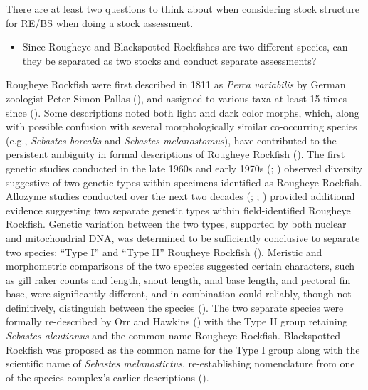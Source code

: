 \documentclass[
]{scrartcl}
\providecommand{\tightlist}{%
  \setlength{\itemsep}{0pt}\setlength{\parskip}{0pt}}\usepackage{longtable,booktabs,array}
\begin{document}
There are at least two questions to think about when considering stock
structure for RE/BS when doing a stock assessment.

\begin{itemize}
\tightlist
\item
  Since Rougheye and Blackspotted Rockfishes are two different species,
  can they be separated as two stocks and conduct separate assessments?
\end{itemize}

Rougheye Rockfish were first described in 1811 as \emph{Perca
variabilis} by German zoologist Peter Simon Pallas
(), and
assigned to various taxa at least 15 times since
(). Some descriptions noted both light and dark color morphs, which,
along with possible confusion with several morphologically similar
co-occurring species (e.g., \emph{Sebastes borealis} and \emph{Sebastes
melanostomus}), have contributed to the persistent ambiguity in formal
descriptions of Rougheye Rockfish (). The first genetic studies conducted in the late
1960s and early 1970s (; ) observed diversity suggestive of two genetic types within
specimens identified as Rougheye Rockfish. Allozyme studies conducted
over the next two decades (; ; )
provided additional evidence suggesting two separate genetic types
within field-identified Rougheye Rockfish. Genetic variation between the
two types, supported by both nuclear and mitochondrial DNA, was
determined to be sufficiently conclusive to separate two species: ``Type
I'' and ``Type II'' Rougheye Rockfish
().
Meristic and morphometric comparisons of the two species suggested
certain characters, such as gill raker counts and length, snout length,
anal base length, and pectoral fin base, were significantly different,
and in combination could reliably, though not definitively, distinguish
between the species (). The two separate species were formally
re-described by Orr and Hawkins ()
with the Type II group retaining \emph{Sebastes aleutianus} and the
common name Rougheye Rockfish. Blackspotted Rockfish was proposed as the
common name for the Type I group along with the scientific name of
\emph{Sebastes melanostictus}, re-establishing nomenclature from one of
the species complex's earlier descriptions
().
\end{document}

